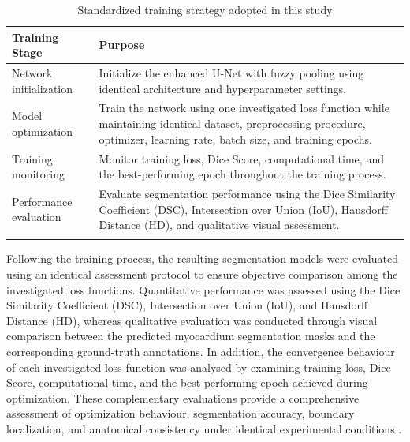 \begin{table}[htbp]
	\centering
	\caption{Standardized training strategy adopted in this study}
	\label{tab:ch5-training-strategy}
	
	\small
	\renewcommand{\arraystretch}{1.3}
	\begin{tabularx}{\textwidth}{
			>{\raggedright\arraybackslash}p{}
			>{\raggedright\arraybackslash}X
		}
		\toprule
		\textbf{Training Stage} & \textbf{Purpose} \\
		\midrule
		Network initialization & Initialize the enhanced U-Net with fuzzy pooling using identical architecture and hyperparameter settings. \\ \addlinespace
		Model optimization & Train the network using one investigated loss function while maintaining identical dataset, preprocessing procedure, optimizer, learning rate, batch size, and training epochs. \\ \addlinespace
		Training monitoring & Monitor training loss, Dice Score, computational time, and the best-performing epoch throughout the training process. \\ \addlinespace
		Performance evaluation & Evaluate segmentation performance using the Dice Similarity Coefficient (DSC), Intersection over Union (IoU), Hausdorff Distance (HD), and qualitative visual assessment. \\
		\bottomrule
		\multicolumn{2}{@{}l}{\vspace{4pt}\footnotesize \textit{Source:} Adapted from \citet{Riandini2025Array}.}
	\end{tabularx}
\end{table}

Following the training process, the resulting segmentation models were evaluated using an identical assessment protocol to ensure objective comparison among the investigated loss functions. Quantitative performance was assessed using the Dice Similarity Coefficient (DSC), Intersection over Union (IoU), and Hausdorff Distance (HD), whereas qualitative evaluation was conducted through visual comparison between the predicted myocardium segmentation masks and the corresponding ground-truth annotations. In addition, the convergence behaviour of each investigated loss function was analysed by examining training loss, Dice Score, computational time, and the best-performing epoch achieved during optimization. These complementary evaluations provide a comprehensive assessment of optimization behaviour, segmentation accuracy, boundary localization, and anatomical consistency under identical experimental conditions \citep{Taha2015,Riandini2025Array}. 

